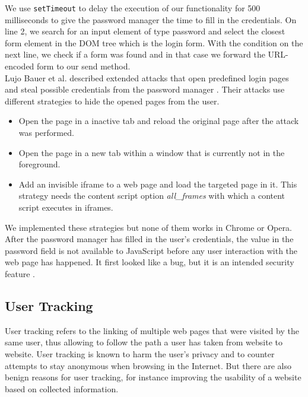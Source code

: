 	We use \texttt{setTimeout} to delay the execution of our functionality for 500 milliseconds to give the password manager the time to fill in the credentials. On line 2, we search for an input element of type password and select the closest form element in the DOM tree which is the login form. With the condition on the next line, we check if a form was found and in that case we forward the URL-encoded form to our send method. \\
	
	Lujo Bauer et al. described extended attacks that open predefined login pages and steal possible credentials from the password manager \cite{extensions:cns14}. Their attacks use different strategies to hide the opened pages from the user. 
	\begin{itemize}
		\itemsep0em
		\item Open the page in a inactive tab and reload the original page after the attack was performed. 
		\item Open the page in a new tab within a window that is currently not in the foreground.
		\item Add an invisible iframe to a web page and load the targeted page in it. This strategy needs the content script option \textit{all\_frames} with which a content script executes in iframes. 
	\end{itemize}
	We implemented these strategies but none of them works in Chrome or Opera. After the password manager has filled in the user's credentials, the value in the password field is not available to JavaScript before any user interaction with the web page has happened. It first looked like a bug, but it is an intended security feature \cite{chromiumBlogPasswordInput}. 
	
	
	\subsection{User Tracking}
	
	User tracking refers to the linking of multiple web pages that were visited by the same user, thus allowing to follow the path a user has taken from website to website. User tracking is known to harm the user's privacy and to counter attempts to stay anonymous when browsing in the Internet. %
	But there are also benign reasons for user tracking, for instance improving the usability of a website based on collected information. \\ 
	
